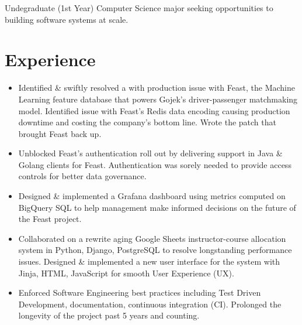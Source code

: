 %
%


\fancyhead{} %


Undegraduate (1st Year) Computer Science major seeking opportunities to building software systems at scale.

\section{Experience}
\begin{itemize}
    \item Identified \& swiftly resolved a with production issue with Feast, the Machine Learning
      feature database that powers Gojek's driver-passenger matchmaking model.
      Identified issue with Feast's Redis data encoding causing production downtime and 
      costing the company's bottom line. Wrote the patch that brought Feast back up.
    \item Unblocked Feast's authentication roll out by delivering
      support in Java \& Golang clients for Feast.
      Authentication was sorely needed to provide access controls for better data governance.
    \item 
        Designed \& implemented a Grafana dashboard using metrics computed on 
        BigQuery SQL to help management make informed decisions 
        on the future of the Feast project.
\end{itemize}

\begin{itemize}
  \item Collaborated on a rewrite aging Google Sheets instructor-course allocation system in Python, Django, PostgreSQL to 
    resolve longstanding performance issues. Designed \& implemented a new user interface 
    for the system with Jinja, HTML, JavaScript for smooth User Experience (UX).
  \item Enforced Software Engineering best practices including Test Driven Development,
    documentation, continuous integration (CI). Prolonged the longevity of the project
    past 5 years and counting.
\end{itemize}

